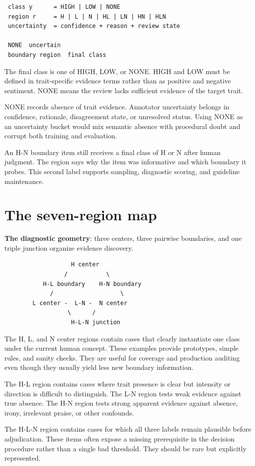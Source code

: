 \begin{verbatim}
 class y      = HIGH | LOW | NONE
 region r     = H | L | N | HL | LN | HN | HLN
 uncertainty  = confidence + reason + review state

 NONE  uncertain
 boundary region  final class
\end{verbatim}
The final class is one of HIGH, LOW, or NONE. HIGH and LOW must be defined in trait-specific evidence terms rather than as positive and negative sentiment. NONE means the review lacks sufficient evidence of the target trait.

NONE records absence of trait evidence. Annotator uncertainty belongs in confidence, rationale, disagreement state, or unresolved status. Using NONE as an uncertainty bucket would mix semantic absence with procedural doubt and corrupt both training and evaluation.

An H-N boundary item still receives a final class of H or N after human judgment. The region says why the item was informative and which boundary it probes. This second label supports sampling, diagnostic scoring, and guideline maintenance.


\section{The seven-region map}
\textbf{The diagnostic geometry}: three centers, three pairwise boundaries, and one triple junction organize evidence discovery.

\begin{verbatim}
                   H center
                 /           \
           H-L boundary    H-N boundary
             /                   \
        L center -  L-N -  N center
                  \      /
                   H-L-N junction
\end{verbatim}
The H, L, and N center regions contain cases that clearly instantiate one class under the current human concept. These examples provide prototypes, simple rules, and sanity checks. They are useful for coverage and production auditing even though they usually yield less new boundary information.

The H-L region contains cases where trait presence is clear but intensity or direction is difficult to distinguish. The L-N region tests weak evidence against true absence. The H-N region tests strong apparent evidence against absence, irony, irrelevant praise, or other confounds.

The H-L-N region contains cases for which all three labels remain plausible before adjudication. These items often expose a missing prerequisite in the decision procedure rather than a single bad threshold. They should be rare but explicitly represented.

